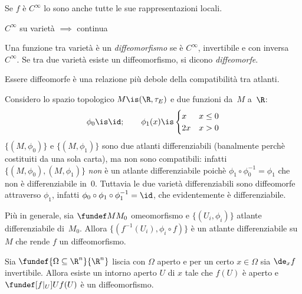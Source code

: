 \begin{ex}
	Se $f$ è $C^\infty$ lo sono anche tutte le sue rappresentazioni locali.
\end{ex}

\begin{ex}
	$C^\infty$ su varietà $\implies$ continua
\end{ex}

\begin{defn}
	Una funzione tra varietà è un \emph{diffeomorfismo}
	se è $C^\infty$, invertibile e con inversa $C^\infty$.
	Se tra due varietà esiste un diffeomorfismo, si dicono \emph{diffeomorfe}.
\end{defn}

\begin{oss}
	Essere diffeomorfe è una relazione più debole della compatibilità tra atlanti.
\end{oss}

\begin{es}
	Considero lo spazio topologico $M \is (\R,\tau_E)$ e due funzioni da~$M$ a~$\R$:
	\[\phi_0\is \id; \qquad
	\phi_1(x)\is
	\begin{cases}
		x & x\le 0 \\
		2x & x>0
	\end{cases}\]
	$\{(M,\phi_0)\}$ e $\{(M,\phi_1)\}$ sono due atlanti differenziabili
	(banalmente perchè costituiti da una sola carta),
	ma non sono compatibili:
	infatti $\{(M,\phi_0),(M,\phi_1)\}$ \emph{non} è un atlante differenziabile
	poichè $\phi_1 \circ \phi_0^{-1} = \phi_1$ che non è differenziabile in~0.
	Tuttavia le due varietà differenziabili sono diffeomorfe attraverso $\phi_1$,
	infatti $\phi_0 \circ \phi_1 \circ \phi_1^{-1} = \id$,
	che evidentemente è differenziabile.
\end{es}

\begin{es}
	Più in generale,
	sia $\fundef M{M_0}$ omeomorfismo
	e $\{(U_i,\phi_i)\}$ atlante differenziabile di~$M_0$.
	Allora $\{(f^{-1}(U_i),\phi_i\circ f)\}$ è un atlante differenziabile su~$M$
	che rende $f$ un diffeomorfismo.
\end{es}


\begin{fat}
	Sia $\fundef{\Omega\subseteq\R^n}{\R^n}$ liscia con $\Omega$ aperto
	e per un certo $x\in\Omega$ sia $\de_xf$ invertibile.
	Allora esiste un intorno aperto $U$ di $x$
	tale che $f(U)$ è aperto e $\fundef[f|_U]U{f(U)}$ è un diffeomorfismo.
\end{fat}

